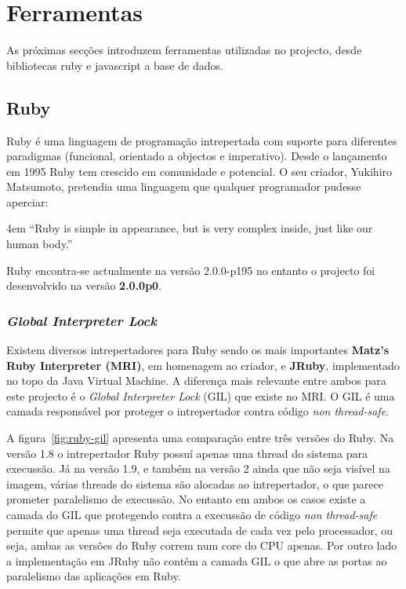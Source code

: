 \section{Ferramentas}

As próximas secções introduzem ferramentas utilizadas no projecto, desde bibliotecas ruby e javascript a base de dados.

\subsection{Ruby}

Ruby é uma linguagem de programação intrepertada com suporte para diferentes paradigmas (funcional, orientado a objectos e imperativo). Desde o lançamento em 1995 Ruby tem crescido em comunidade e potencial. O seu criador, Yukihiro Matsumoto, pretendia uma linguagem que qualquer programador pudesse aperciar:

\begingroup
\leftskip4em
\rightskip\leftskip
``Ruby is simple in appearance, but is very complex inside, just like our human body.'' \cite{matz}
\par
\endgroup

Ruby encontra-se actualmente na versão 2.0.0-p195 no entanto o projecto foi desenvolvido na versão \textbf{2.0.0p0}.

\subsubsection{\textit{Global Interpreter Lock}}
\label{sec:gil}

Existem diversos intrepertadores para Ruby sendo os mais importantes \textbf{Matz's Ruby Interpreter (MRI)}, em homenagem ao criador, e \textbf{JRuby}, implementado no topo da Java Virtual Machine. 
A diferença mais relevante entre ambos para este projecto é o \textit{Global Interpreter Lock} (GIL) que existe no MRI. O GIL é uma camada responsável por proteger o intrepertador contra código \textit{non thread-safe}.

A figura~\ref{fig:ruby-gil} apresenta uma comparação entre três versões do Ruby. Na versão 1.8 o intrepertador Ruby possuí apenas uma thread do sistema para execussão. Já na versão 1.9, e também na versão 2 ainda que não seja visível na imagem, várias threads do sistema são alocadas ao intrepertador, o que parece prometer paralelismo de execussão. No entanto em ambos os casos existe a camada do GIL que protegendo contra a execussão de código \textit{non thread-safe} permite que apenas uma thread seja executada de cada vez pelo processador, ou seja, ambas as versões do Ruby correm num core do CPU apenas.
Por outro lado a implementação em JRuby não contém a camada GIL o que abre as portas ao paralelismo das aplicações em Ruby.

